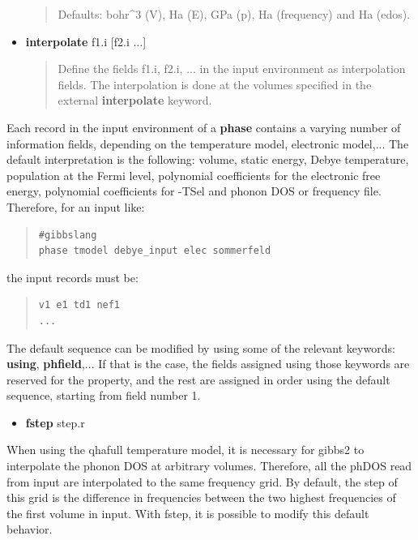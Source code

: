 \documentclass[a4paper]{article}
\begin{document}
\begin{itemize}
\begin{quote}
Defaults: bohr\textasciicircum{}3 (V), Ha (E), GPa (p), Ha (frequency) and Ha (edos).
\end{quote}

\item \textbf{interpolate} f1.i {[}f2.i ...{]}

\begin{quote}
Define the fields f1.i, f2.i, ... in the input environment as
interpolation fields. The interpolation is done at the volumes
specified in the external \textbf{interpolate} keyword.
\end{quote}
\end{itemize}

Each record in the input environment of a \textbf{phase} contains a varying
number of information fields, depending on the temperature model,
electronic model,... The default interpretation is the following:
volume, static energy, Debye temperature, population at the Fermi
level, polynomial coefficients for the electronic free energy,
polynomial coefficients for -TSel and phonon DOS or frequency
file. Therefore, for an input like:

\begin{quote}
\begin{verbatim}
#gibbslang
phase tmodel debye_input elec sommerfeld
\end{verbatim}
\end{quote}

the input records must be:

\begin{quote}
\begin{verbatim}
v1 e1 td1 nef1
...
\end{verbatim}
\end{quote}

The default sequence can be modified by using some of the relevant
keywords: \textbf{using}, \textbf{phfield},... If that is the case, the fields
assigned using those keywords are reserved for the property, and the
rest are assigned in order using the default sequence, starting from
field number 1.

\begin{itemize}
\item \textbf{fstep} step.r
\end{itemize}

When using the qhafull temperature model, it is necessary for gibbs2
to interpolate the phonon DOS at arbitrary volumes. Therefore, all the
phDOS read from input are interpolated to the same frequency grid. By
default, the step of this grid is the difference in frequencies
between the two highest frequencies of the first volume in input. With
fstep, it is possible to modify this default behavior.
\end{document}
